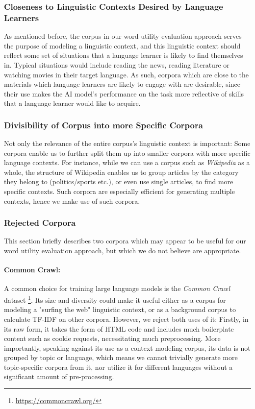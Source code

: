 \subsubsection{Closeness to Linguistic Contexts Desired by Language Learners}
As mentioned before, the corpus in our word utility evaluation approach serves the purpose of modeling a linguistic context, and this linguistic context should reflect some set of situations that a language learner is likely to find themselves in.
Typical situations would include reading the news, reading literature or watching movies in their target language.
As such, corpora which are close to the materials which language learners are likely to engage with are desirable, since their use makes the AI model's performance on the task more reflective of skills that a language learner would like to acquire.

\subsubsection{Divisibility of Corpus into more Specific Corpora}
Not only the relevance of the entire corpus's linguistic context is important:
Some corpora enable us to further split them up into smaller corpora with more specific language contexts.
For instance, while we can use a corpus such as \textit{Wikipedia} as a whole, the structure of Wikipedia enables us to group articles by the category they belong to (politics/sports etc.), or even use single articles, to find more specific contexts.
Such corpora are especially efficient for generating multiple contexts, hence we make use of such corpora.


\subsubsection{Rejected Corpora} \label{sec:rejected-corpora}
This section briefly describes two corpora which may appear to be useful for our word utility evaluation approach, but which we do not believe are appropriate.

\paragraph{Common Crawl:}
A common choice for training large language models is the \textit{Common Crawl} dataset \footnote{\url{https://commoncrawl.org/}}.
Its size and diversity could make it useful either as a corpus for modeling a "surfing the web" linguistic context, or as a background corpus to calculate TF-IDF on other corpora.
However, we reject both uses of it:
Firstly, in its raw form, it takes the form of HTML code and includes much boilerplate content such as cookie requests, necessitating much preprocessing.
More importantly, speaking against its use as a context-modeling corpus, its data is not grouped by topic or language, which means we cannot trivially generate more topic-specific corpora from it, nor utilize it for different languages without a significant amount of pre-processing.


